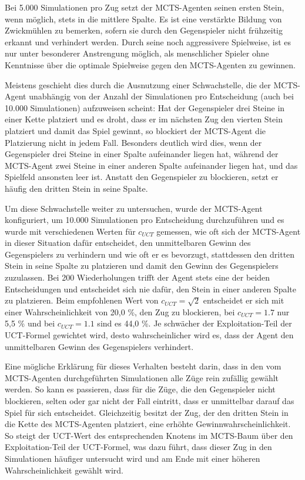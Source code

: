 Bei 5.000 Simulationen pro Zug setzt der MCTS-Agenten seinen ersten Stein, wenn möglich, stets in die mittlere Spalte. Es ist eine verstärkte Bildung von Zwickmühlen zu bemerken, sofern sie durch den Gegenspieler nicht frühzeitig erkannt und verhindert werden. Durch seine noch aggressivere Spielweise, ist es nur unter besonderer Anstrengung möglich, als menschlicher Spieler ohne Kenntnisse über die optimale Spielweise gegen den MCTS-Agenten zu gewinnen.

Meistens geschieht dies durch die Ausnutzung einer Schwachstelle, die der MCTS-Agent unabhängig von der Anzahl der Simulationen pro Entscheidung (auch bei 10.000 Simulationen) aufzuweisen scheint: Hat der Gegenspieler drei Steine in einer Kette platziert und es droht, dass er im nächsten Zug den vierten Stein platziert und damit das Spiel gewinnt, so blockiert der MCTS-Agent die Platzierung nicht in jedem Fall. Besonders deutlich wird dies, wenn der Gegenspieler drei Steine in einer Spalte aufeinander liegen hat, während der MCTS-Agent zwei Steine in einer anderen Spalte aufeinander liegen hat, und das Spielfeld ansonsten leer ist. Anstatt den Gegenspieler zu blockieren, setzt er häufig den dritten Stein in seine Spalte.

Um diese Schwachstelle weiter zu untersuchen, wurde der MCTS-Agent konfiguriert, um 10.000 Simulationen pro Entscheidung durchzuführen und es wurde mit verschiedenen Werten für $c_{UCT}$ gemessen, wie oft sich der MCTS-Agent in dieser Situation dafür entscheidet, den unmittelbaren Gewinn des Gegenspielers zu verhindern und wie oft er es bevorzugt, stattdessen den dritten Stein in seine Spalte zu platzieren und damit den Gewinn des Gegenspielers zuzulassen. Bei 200 Wiederholungen trifft der Agent stets eine der beiden Entscheidungen und entscheidet sich nie dafür, den Stein in einer anderen Spalte zu platzieren. Beim empfohlenen Wert von $c_{UCT} = \sqrt2$ entscheidet er sich mit einer Wahrscheinlichkeit von 20,0 \%, den Zug zu blockieren, bei $c_{UCT} = 1.7$ nur 5,5 \% und bei $c_{UCT} = 1.1$ sind es 44,0 \%. Je schwächer der Exploitation-Teil der UCT-Formel gewichtet wird, desto wahrscheinlicher wird es, dass der Agent den unmittelbaren Gewinn des Gegenspielers verhindert.

Eine mögliche Erklärung für dieses Verhalten besteht darin, dass in den vom MCTS-Agenten durchgeführten Simulationen alle Züge rein zufällig gewählt werden. So kann es passieren, dass für die Züge, die den Gegenspieler nicht blockieren, selten oder gar nicht der Fall eintritt, dass er unmittelbar darauf das Spiel für sich entscheidet. Gleichzeitig besitzt der Zug, der den dritten Stein in die Kette des MCTS-Agenten platziert, eine erhöhte Gewinnwahrscheinlichkeit. So steigt der UCT-Wert des entsprechenden Knotens im MCTS-Baum über den Exploitation-Teil der UCT-Formel, was dazu führt, dass dieser Zug in den Simulationen häufiger untersucht wird und am Ende mit einer höheren Wahrscheinlichkeit gewählt wird.

